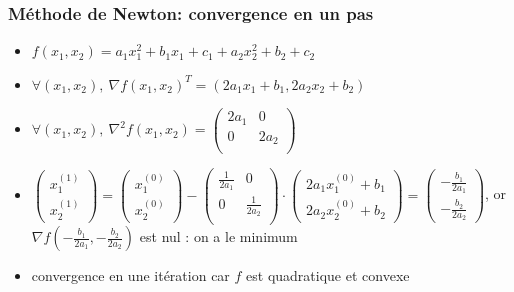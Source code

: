 \documentclass{beamer}
\begin{document}
\begin{frame}
  \frametitle{Méthode de Newton: convergence en un pas}

  \begin{itemize}
  \item $f(x_1,x_2) = a_1x_1^2 + b_1x_1 + c_1 + a_2x_2^2 + b_2 + c_2$
  \item 
    $\forall (x_1,x_2), \ {\nabla f}(x_1,x_2)^T = (2a_1x_1 + b_1,2a_2x_2 + b_2)$
  \item 
  $ \forall (x_1,x_2), \ \nabla^2f(x_1,x_2) =
  \left(\begin{array}{cc}
    2a_1 & 0 \\
    0 & 2a_2 \\
  \end{array}
  \right)
  $
  \end{itemize}

  \begin{itemize}
  \item $\left( \begin{array}{c} x_1^{(1)} \\ x_2^{(1)} \end{array} \right ) =
    \left( \begin{array}{c} x_1^{(0)} \\ x_2^{(0)} \end{array} \right ) -
  \left(\begin{array}{cc} \frac{1}{2a_1} & 0 \\ 0 & \frac{1}{2a_2} \\ \end{array} \right) \cdot
  \left( \begin{array}{c} 2a_1x_1^{(0)} + b_1 \\ 2a_2x_2^{(0)} + b_2 \end{array} \right ) =
  \left( \begin{array}{c} -\frac{b_1}{2a_1} \\ -\frac{b_2}{2a_2} \end{array} \right ) $, or
  ${\nabla f}(-\frac{b_1}{2a_1}, -\frac{b_2}{2a_2})$ est nul : on a le minimum
  \item \alert{convergence en une itération car $f$ est quadratique et convexe}
  \end{itemize}
  
\end{frame}
\end{document}
